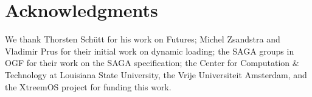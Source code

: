 \documentclass{acm_proc_article-sp}
\begin{document}
  \section{Acknowledgments}
  \label{sec:ack}
  
  We thank Thorsten Sch\"utt for his work on Futures; Michel Zsandstra
  and Vladimir Prus for their initial work on dynamic loading; the SAGA 
  groups in OGF for their work on the SAGA specification; the Center 
  for Computation \& Technology at
  Louisiana State University, the Vrije Universiteit Amsterdam, and
  the XtreemOS project for funding this work.




\end{document}
